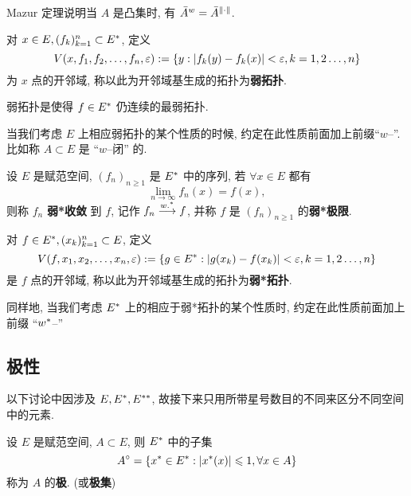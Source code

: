 	Mazur 定理说明当 $ A $ 是凸集时, 有 $ \bar{A}^{w}=\bar{A}^{\left\| \cdot \right\|} $.

	\begin{Definition}[弱拓扑]\label{def:弱拓扑}
		对 $ x\in E, (f_{k})_{k=1}^{n}\subset E^{*} $, 定义
		\[
			V(x, f_{1}, f_{2}, \dots, f_{n}, \varepsilon):=\{ y:\left| f_{k}(y)-f_{k}(x) \right| <\varepsilon, k=1, 2\dots, n \}
		\]
		为 $ x $ 点的开邻域, 称以此为开邻域基生成的拓扑为\textbf{弱拓扑}.
	\end{Definition}
	\begin{Remark}
		弱拓扑是使得 $ f\in E^{*} $ 仍连续的最弱拓扑.
	\end{Remark}
	\begin{Remark}
		当我们考虑 $ E $ 上相应弱拓扑的某个性质的时候, 约定在此性质前面加上前缀``$ w $--''. 比如称 $ A\subset E $ 是 ``$ w $--闭'' 的.
	\end{Remark}

	\begin{Definition}[弱*收敛]\label{def:弱*收敛}
		设 $ E $ 是赋范空间, $ (f_{n})_{n\geqslant1} $ 是 $ E^{*} $ 中的序列, 若 $ \forall x\in E $ 都有
		\[
			\lim_{n\to\infty}f_{n}(x)=f(x),
		\]
		则称 $ f_{n} $ \textbf{弱*收敛} 到 $ f $, 记作 $ f_{n}\overset{w.^{*}}{\longrightarrow} f $, 并称 $ f $ 是 $ (f_{n})_{n\geqslant1} $ 的\textbf{弱*极限}.
	\end{Definition}
	\begin{Definition}[弱*拓扑]\label{def:弱*拓扑}
		对 $ f\in E^{*}, (x_{k})_{k=1}^{n}\subset E $, 定义
		\[
			V(f, x_{1}, x_{2}, \dots, x_{n}, \varepsilon):=\{ g\in E^{*}:\left| g(x_{k})-f(x_{k}) \right| <\varepsilon, k=1, 2\dots, n \}
		\]
		是 $ f $ 点的开邻域, 称以此为开邻域基生成的拓扑为\textbf{弱*拓扑}.
	\end{Definition}
	\begin{Remark}
		同样地, 当我们考虑 $ E^{*} $ 上的相应于弱*拓扑的某个性质时, 约定在此性质前面加上前缀 ``$w^{*}$--''
	\end{Remark}


	\subsection{极性}
	以下讨论中因涉及 $ E, E^{*}, E^{**} $, 故接下来只用所带星号数目的不同来区分不同空间中的元素.
	
	\begin{Definition}[极]\label{def:极}
		设 $ E $ 是赋范空间, $ A\subset E $, 则 $ E^{*} $ 中的子集
		\[
			A^{\circ} = \{ x^{*}\in E^{*}:\left| x^{*}(x) \right| \leqslant1, \forall x\in A \}
		\]
		称为 $ A $ 的\textbf{极}. (或\textbf{极集})
	\end{Definition}

